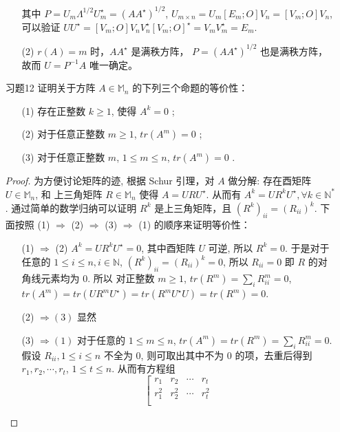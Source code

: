 \documentclass{article}
\begin{document}
\begin{spacing}{1.5}
\begin{itemize}
\begin{itemize}
        其中 $P = U_m \Lambda^{1/2} U_m^\star = (AA^\star)^{1/2}$, $U_{m\times n} = U_m [E_m; O] V_n = [V_m; O] V_n$, 可以验证 $U U^\star = [V_m; O] V_n V_n^\star [V_m; O]^\star = V_mV_m^\star = E_m$. 

        \item [(2)] $r(A) = m$ 时，$AA^\star$ 是满秩方阵， $P = (AA^\star)^{1/2}$ 也是满秩方阵，故而 $U = P^{-1}A$ 唯一确定。

    \end{itemize}

    \item [习题12] 证明关于方阵 $A\in\mathbb{M}_n$ 的下列三个命题的等价性：
    \begin{itemize}
        \item [(1)] 存在正整数 $k \geq 1$, 使得 $A^k = 0$ ;
        \item [(2)] 对于任意正整数 $m\geq 1$, $tr(A^m) = 0$ ;
        \item [(3)] 对于任意正整数 $m$, $1\leq m \leq n$, $tr(A^m) = 0$ .
    \end{itemize}
    \begin{proof}
        为方便讨论矩阵的迹, 根据 Schur 引理，对 $A$ 做分解: 存在酉矩阵 $U\in\mathbb{M}_n$, 和 上三角矩阵 $R\in\mathbb{M}_n$ 使得 $A = URU^\star$. 从而有 $A^k = UR^kU^\star, \forall k\in\mathbb{N}^*$. 通过简单的数学归纳可以证明 $R^k$ 是上三角矩阵，且 $(R^k)_{ii} = (R_{ii})^k$. 下面按照 (1) $\Rightarrow $ (2) $\Rightarrow $ (3) $\Rightarrow$ (1) 的顺序来证明等价性：
        \begin{itemize}
            \item [(1) $\Rightarrow$ (2)] $A^k = UR^kU^\star = 0$, 其中酉矩阵 $U$ 可逆, 所以 $R^k = 0$. 于是对于任意的 $1\leq i\leq n, i\in\mathbb{N}$, $(R^k)_{ii} = (R_{ii})^k = 0$, 所以 $R_{ii} = 0$ 即 $R$ 的对角线元素均为 $0$. 所以 对正整数 $m\geq 1$, $tr(R^m) = \sum_i R_{ii}^m = 0$, $tr(A^m) = tr(UR^mU^\star) = tr(R^mU^\star U) = tr(R^m) = 0$.
            \item [(2) $\Rightarrow (3)$] 显然
            \item [(3) $\Rightarrow (1)$] 对于任意的 $1\leq m\leq n$, $tr(A^m) = tr(R^m) = \sum_{i} R_{ii}^m = 0$. 假设 $R_{ii}, 1\leq i\leq n$ 不全为 $0$, 则可取出其中不为 $0$ 的项，去重后得到 $r_1, r_2, \cdots, r_t$, $1\leq t \leq n$. 从而有方程组
            $$\left[\begin{array}{cccc}
                r_1 & r_2 & \cdots & r_t\\
                r_1^2 & r_2^2 & \cdots & r_t^2\\

\end{array}$$
\end{itemize}
\end{proof}
\end{itemize}
\end{spacing}
\end{document}
